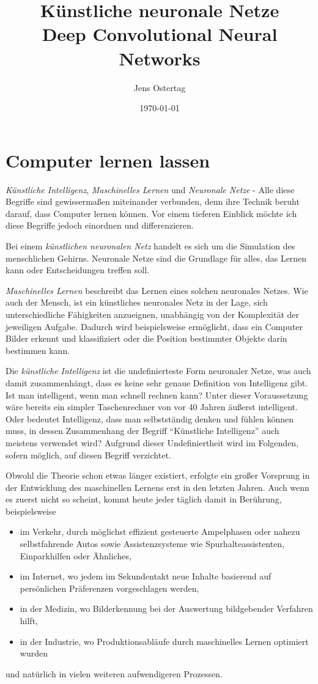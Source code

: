 \documentclass[12pt,a4]{article}
\title{\textbf{Künstliche neuronale Netze\\Deep Convolutional Neural Networks}}
\author{Jens Ostertag}
\date{\today}
\begin{document}
\maketitle
\tableofcontents
\clearpage
\section{Computer lernen lassen}\label{sec:Introduction}
\textit{Künstliche Intelligenz}, \textit{Maschinelles Lernen} und \textit{Neuronale Netze} - Alle diese Begriffe sind gewissermaßen miteinander verbunden, denn ihre Technik beruht darauf, dass Computer lernen können. Vor einem tieferen Einblick möchte ich diese Begriffe jedoch einordnen und differenzieren.

Bei einem \textit{künstlichen neuronalen Netz} handelt es sich um die Simulation des menschlichen Gehirns. Neuronale Netze sind die Grundlage für alles, das Lernen kann oder Entscheidungen treffen soll.

\textit{Maschinelles Lernen} beschreibt das Lernen eines solchen neuronales Netzes. Wie auch der Mensch, ist ein künstliches neuronales Netz in der Lage, sich unterschiedliche Fähigkeiten anzueignen, unabhängig von der Komplexität der jeweiligen Aufgabe. Dadurch wird beispielsweise ermöglicht, dass ein Computer Bilder erkennt und klassifiziert oder die Position bestimmter Objekte darin bestimmen kann.

Die \textit{künstliche Intelligenz} ist die undefinierteste Form neuronaler Netze, was auch damit zusammenhängt, dass es keine sehr genaue Definition von Intelligenz gibt. Ist man intelligent, wenn man schnell rechnen kann? Unter dieser Voraussetzung wäre bereits ein simpler Taschenrechner von vor 40 Jahren äußerst intelligent. Oder bedeutet Intelligenz, dass man selbstständig denken und fühlen können muss, in dessen Zusammenhang der Begriff \enquote{Künstliche Intelligenz} auch meistens verwendet wird?
Aufgrund dieser Undefiniertheit wird im Folgenden, sofern möglich, auf diesen Begriff verzichtet.

Obwohl die Theorie schon etwas länger existiert, erfolgte ein großer Vorsprung in der Entwicklung des maschinellen Lernens erst in den letzten Jahren. Auch wenn es zuerst nicht so scheint, kommt heute jeder täglich damit in Berührung, beispielsweise
\begin{itemize}
\item im Verkehr, durch möglichst effizient gesteuerte Ampelphasen oder nahezu selbstfahrende Autos sowie Assistenzsysteme wie Spurhalteassistenten, Einparkhilfen oder Ähnliches,
\item im Internet, wo jedem im Sekundentakt neue Inhalte basierend auf persönlichen Präferenzen vorgeschlagen werden,
\item in der Medizin, wo Bilderkennung bei der Auswertung bildgebender Verfahren hilft,
\item in der Industrie, wo Produktionsabläufe durch maschinelles Lernen optimiert wurden
\end{itemize}
und natürlich in vielen weiteren aufwendigeren Prozessen.
\end{document}
